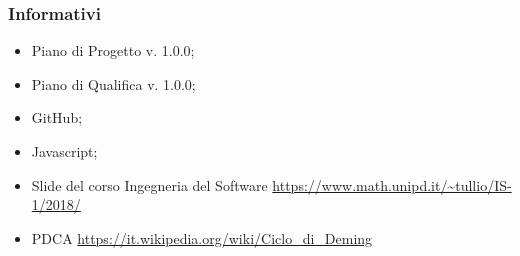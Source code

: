     \subsubsection{Informativi}
	    \begin{itemize}
	        \item Piano di Progetto v. 1.0.0;
	        \item Piano di Qualifica v. 1.0.0;
	        \item GitHub\pedice;
	        \item Javascript\pedice;
            \item Slide del corso Ingegneria del Software \newline
            \url{https://www.math.unipd.it/~tullio/IS-1/2018/}
            \item PDCA\newline
            \url{https://it.wikipedia.org/wiki/Ciclo_di_Deming}
	    \end{itemize}
